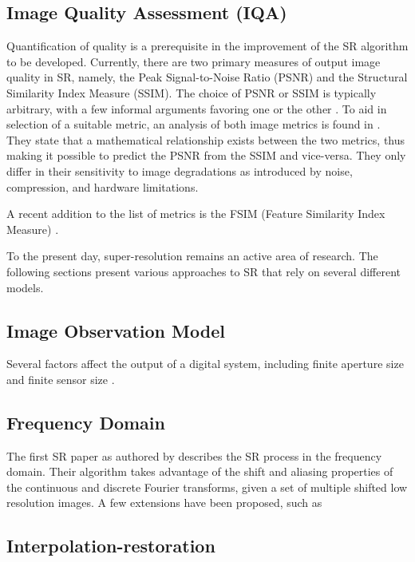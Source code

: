 \subsection{Image Quality Assessment (IQA)}
Quantification of quality is a prerequisite in the improvement of the SR algorithm to be developed.
Currently, there are two primary measures of output image quality in SR, namely, the Peak Signal-to-Noise Ratio (PSNR) and the Structural Similarity Index Measure (SSIM). 
The choice of PSNR or SSIM is typically arbitrary, with a few informal arguments favoring one or the other \citep{Farsiu2004}.
To aid in selection of a suitable metric, an analysis of both image metrics is found in \cite{Hore2010}. 
They state that a mathematical relationship exists between the two metrics, thus making it possible to predict the PSNR from the SSIM and vice-versa. 
They only differ in their sensitivity to image degradations as introduced by noise, compression, and hardware limitations.
	
A recent addition to the list of metrics is the FSIM (Feature Similarity Index Measure) \citep{Zhang2011a}.

To the present day, super-resolution remains an active area of research. 
The following sections present various approaches to SR that rely on several different models.

\subsection{Image Observation Model}

Several factors affect the output of a digital system, including finite aperture size and finite sensor size \citep{Yang2010a}. 

\subsection{Frequency Domain}
The first SR paper as authored by \cite{tsai1984multiframe} describes the SR process in the frequency domain. 
Their algorithm takes advantage of the shift and aliasing properties of the continuous and discrete Fourier transforms, given a set of multiple shifted low resolution images. 
A few extensions have been proposed, such as 
\citep{Yang2010a}

\subsection{Interpolation-restoration}

